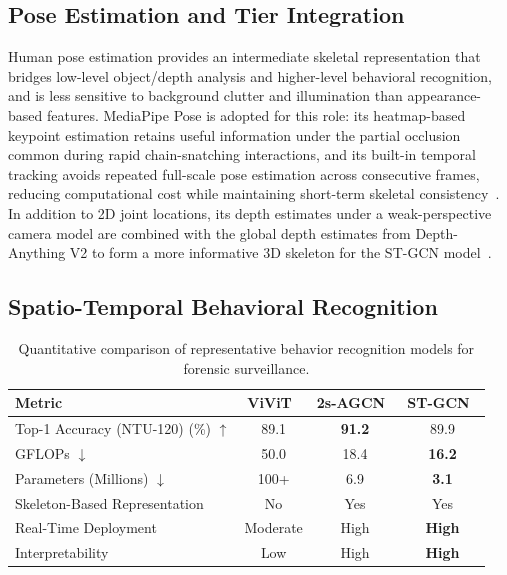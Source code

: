 \documentclass[runningheads]{llncs}
\begin{document}
\subsection{Pose Estimation and Tier Integration}

Human pose estimation provides an intermediate skeletal representation that bridges low-level object/depth analysis and higher-level behavioral recognition, and is less sensitive to background clutter and illumination than appearance-based features. MediaPipe Pose is adopted for this role: its heatmap-based keypoint estimation retains useful information under the partial occlusion common during rapid chain-snatching interactions, and its built-in temporal tracking avoids repeated full-scale pose estimation across consecutive frames, reducing computational cost while maintaining short-term skeletal consistency~\cite{mediapipe}. In addition to 2D joint locations, its depth estimates under a weak-perspective camera model are combined with the global depth estimates from Depth-Anything V2 to form a more informative 3D skeleton for the ST-GCN model~\cite{yang2024depth,yan2018liuhe}.


\subsection{Spatio-Temporal Behavioral Recognition}

\begin{table}[!t]
\centering
\scriptsize
\renewcommand{\arraystretch}{1.2}
\caption{Quantitative comparison of representative behavior recognition models for forensic surveillance.}
\label{tab:behavior_quantitative}

\begin{tabular}{|l|c|c|c|}
\hline
\textbf{Metric} &
\textbf{ViViT~\cite{liu2022video}} &
\textbf{2s-AGCN~\cite{shi2019twostreamagcn,wu20222s}} &
\textbf{ST-GCN~\cite{yan2018stgcn}} \\ \hline

Top-1 Accuracy (NTU-120) (\%) $\uparrow$ &
89.1 &
\textbf{91.2} &
89.9 \\ \hline

GFLOPs $\downarrow$ &
50.0 &
18.4 &
\textbf{16.2} \\ \hline

Parameters (Millions) $\downarrow$ &
100+ &
6.9 &
\textbf{3.1} \\ \hline

Skeleton-Based Representation &
No &
Yes &
Yes \\ \hline

Real-Time Deployment &
Moderate &
High &
\textbf{High} \\ \hline

Interpretability &
Low &
High &
\textbf{High} \\ \hline

\end{tabular}
\end{table}
\end{document}
